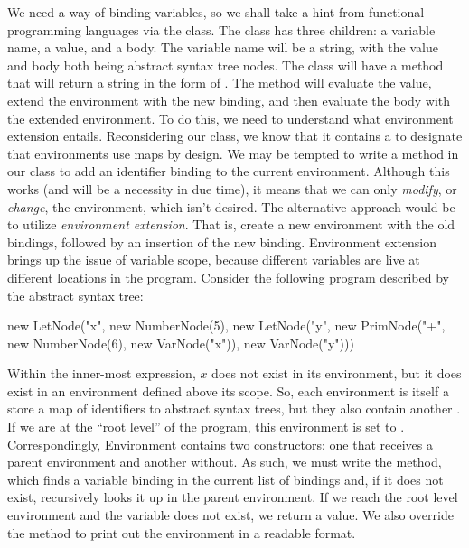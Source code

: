 We need a way of binding variables, so we shall take a hint from functional programming languages via the  class. The  class has three children: a variable name, a value, and a body. The variable name will be a string, with the value and body both being abstract syntax tree nodes. The  class will have a  method that will return a string in the form of . The  method will evaluate the value, extend the environment with the new binding, and then evaluate the body with the extended environment. To do this, we need to understand what environment extension entails. Reconsidering our  class, we know that it contains a  to designate that environments use maps by design. We may be tempted to write a  method in our  class to add an identifier binding to the current environment. Although this works (and will be a necessity in due time), it means that we can only \emph{modify}, or \emph{change}, the environment, which isn't desired. The alternative approach would be to utilize \emph{environment extension}. That is, create a new environment with the old bindings, followed by an insertion of the new binding. Environment extension brings up the issue of variable scope, because different variables are live at different locations in the program. Consider the following program described by the abstract syntax tree:

\begin{verbnobox}[\small]
new LetNode("x", new NumberNode(5), 
 new LetNode("y", new PrimNode("+", new NumberNode(6), new VarNode("x")), 
  new VarNode("y")))
\end{verbnobox}
  
Within the inner-most  expression, $x$ does not exist in its environment, but it does exist in an environment defined above its scope. So, each environment is itself a store a map of identifiers to abstract syntax trees, but they also contain another . If we are at the ``root level'' of the program, this environment is set to . Correspondingly, Environment contains two constructors: one that receives a parent environment and another without. As such, we must write the  method, which finds a variable binding in the current list of bindings and, if it does not exist, recursively looks it up in the parent environment. If we reach the root level environment and the variable does not exist, we return a  value. We also override the  method to print out the environment in a readable format.

